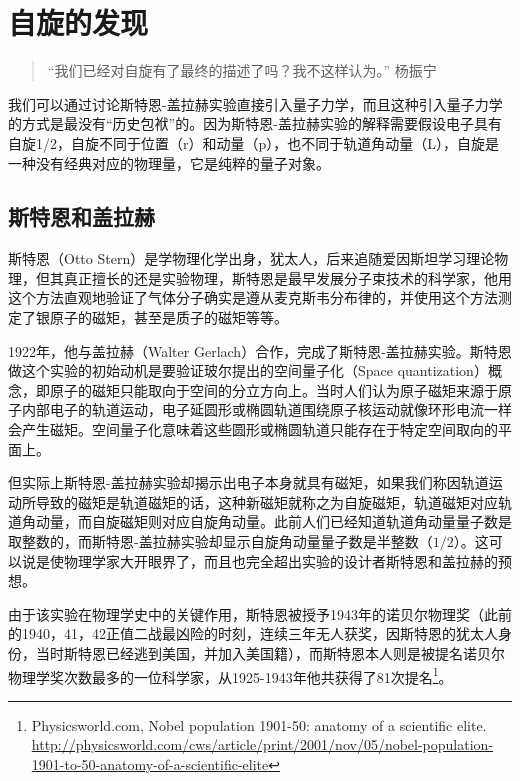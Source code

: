 \section{自旋的发现}

\begin{quotation}
“我们已经对自旋有了最终的描述了吗？我不这样认为。” \qquad 杨振宁
\end{quotation}

我们可以通过讨论斯特恩-盖拉赫实验直接引入量子力学，而且这种引入量子力学的方式是最没有“历史包袱”的。因为斯特恩-盖拉赫实验的解释需要假设电子具有自旋1/2，自旋不同于位置（r）和动量（p），也不同于轨道角动量（L），自旋是一种没有经典对应的物理量，它是纯粹的量子对象。

\subsection{斯特恩和盖拉赫}

斯特恩（Otto Stern）是学物理化学出身，犹太人，后来追随爱因斯坦学习理论物理，但其真正擅长的还是实验物理，斯特恩是最早发展分子束技术的科学家，他用这个方法直观地验证了气体分子确实是遵从麦克斯韦分布律的，并使用这个方法测定了银原子的磁矩，甚至是质子的磁矩等等。

1922年，他与盖拉赫（Walter Gerlach）合作，完成了斯特恩-盖拉赫实验。斯特恩做这个实验的初始动机是要验证玻尔提出的空间量子化（Space quantization）概念，即原子的磁矩只能取向于空间的分立方向上。当时人们认为原子磁矩来源于原子内部电子的轨道运动，电子延圆形或椭圆轨道围绕原子核运动就像环形电流一样会产生磁矩。空间量子化意味着这些圆形或椭圆轨道只能存在于特定空间取向的平面上。

但实际上斯特恩-盖拉赫实验却揭示出电子本身就具有磁矩，如果我们称因轨道运动所导致的磁矩是轨道磁矩的话，这种新磁矩就称之为自旋磁矩，轨道磁矩对应轨道角动量，而自旋磁矩则对应自旋角动量。此前人们已经知道轨道角动量量子数是取整数的，而斯特恩-盖拉赫实验却显示自旋角动量量子数是半整数（$1/2$）。这可以说是使物理学家大开眼界了，而且也完全超出实验的设计者斯特恩和盖拉赫的预想。

由于该实验在物理学史中的关键作用，斯特恩被授予1943年的诺贝尔物理奖（此前的1940，41，42正值二战最凶险的时刻，连续三年无人获奖，因斯特恩的犹太人身份，当时斯特恩已经逃到美国，并加入美国籍），而斯特恩本人则是被提名诺贝尔物理学奖次数最多的一位科学家，从1925-1943年他共获得了81次提名\footnote{Physicsworld.com, Nobel population 1901-50: anatomy of a scientific elite. \url{http://physicsworld.com/cws/article/print/2001/nov/05/nobel-population-1901-to-50-anatomy-of-a-scientific-elite}}。


